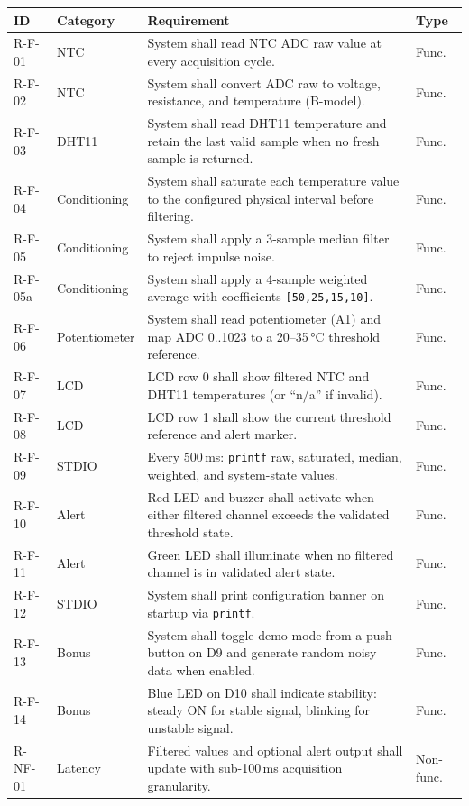 \documentclass[12pt]{article}
\begin{document}
\begin{longtable}{p{1.5cm} p{2.5cm} p{7.5cm} p{1.5cm}}
\toprule
\textbf{ID} & \textbf{Category} & \textbf{Requirement} & \textbf{Type} \\
\midrule
\endfirsthead
R-F-01 & NTC & System shall read NTC ADC raw value at every acquisition cycle. & Func. \\
R-F-02 & NTC & System shall convert ADC raw to voltage, resistance, and temperature (B-model). & Func. \\
R-F-03 & DHT11 & System shall read DHT11 temperature and retain the last valid sample when no fresh sample is returned. & Func. \\
R-F-04 & Conditioning & System shall saturate each temperature value to the configured physical interval before filtering. & Func. \\
R-F-05 & Conditioning & System shall apply a 3-sample median filter to reject impulse noise. & Func. \\
R-F-05a & Conditioning & System shall apply a 4-sample weighted average with coefficients \texttt{[50,25,15,10]}. & Func. \\
R-F-06 & Potentiometer & System shall read potentiometer (A1) and map ADC 0..1023 to a 20--35\,°C threshold reference. & Func. \\
R-F-07 & LCD & LCD row 0 shall show filtered NTC and DHT11 temperatures (or ``n/a'' if invalid). & Func. \\
R-F-08 & LCD & LCD row 1 shall show the current threshold reference and alert marker. & Func. \\
R-F-09 & STDIO & Every 500\,ms: \texttt{printf} raw, saturated, median, weighted, and system-state values. & Func. \\
R-F-10 & Alert & Red LED and buzzer shall activate when either filtered channel exceeds the validated threshold state. & Func. \\
R-F-11 & Alert & Green LED shall illuminate when no filtered channel is in validated alert state. & Func. \\
R-F-12 & STDIO & System shall print configuration banner on startup via \texttt{printf}. & Func. \\
R-F-13 & Bonus & System shall toggle demo mode from a push button on D9 and generate random noisy data when enabled. & Func. \\
R-F-14 & Bonus & Blue LED on D10 shall indicate stability: steady ON for stable signal, blinking for unstable signal. & Func. \\
R-NF-01 & Latency & Filtered values and optional alert output shall update with sub-100\,ms acquisition granularity. & Non-func. \\

\end{longtable}
\end{document}
